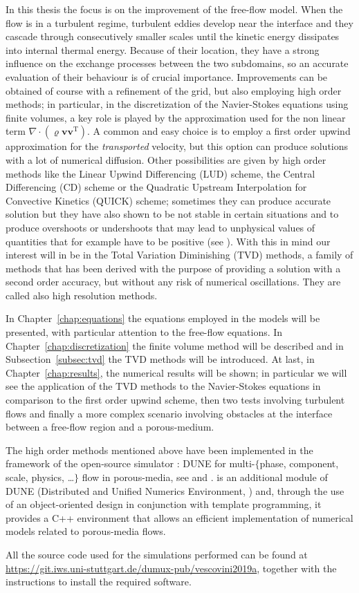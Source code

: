 In this thesis the focus is on the improvement of the free-flow model. When the 
flow is in a turbulent regime, turbulent eddies develop near the interface and 
they cascade through consecutively smaller scales until the kinetic energy 
dissipates into internal thermal energy. Because of their location, they have 
a strong influence on the exchange processes between the two subdomains, so an 
accurate evaluation of their behaviour is of crucial importance. Improvements 
can be obtained of course with a refinement of the grid, but also employing 
high order methods; in 
particular, in the discretization of the Navier-Stokes equations using finite 
volumes, a key role is played by the approximation used for the non linear term 
$\nabla \cdot (\varrho \mathbf{v} \mathbf{v}^\mathrm{T})$. A common and easy 
choice is to employ a first order upwind approximation for the 
\emph{transported} velocity, but this option can produce solutions with a lot 
of numerical diffusion. Other possibilities are given by high order methods 
like the Linear Upwind Differencing (LUD) scheme, the Central Differencing (CD) 
scheme or the Quadratic Upstream Interpolation for Convective Kinetics (QUICK) 
scheme; sometimes they can produce 
accurate solution but they have also shown to be not stable in certain 
situations and to produce overshoots or undershoots that 
may lead to unphysical values of quantities that for example have to be 
positive (see \cite{main:vermal}). With this in mind our interest will in be in 
the Total Variation Diminishing (TVD) methods, a family of methods that has 
been derived with the purpose of providing a solution with a second order 
accuracy, but without any risk of numerical oscillations. They are called also 
high resolution methods.

In Chapter~\ref{chap:equations} the equations employed in the models will be 
presented, with particular attention to the free-flow equations. In 
Chapter~\ref{chap:discretization} the finite volume method will be described 
and in Subsection~\ref{subsec:tvd} the TVD methods will be introduced. At last, 
in Chapter~\ref{chap:results}, the numerical results will be shown; in 
particular we will see the application of the TVD methods to the Navier-Stokes 
equations in comparison to the first order upwind scheme, then two tests 
involving turbulent flows and finally a more complex scenario involving 
obstacles at the interface between a free-flow region and a porous-medium.

The high order methods mentioned above have been implemented in the framework 
of the open-source simulator \DUMUX: DUNE for multi-$\{$phase, component, 
scale, physics, \dots$\}$ flow in porous-media, see \cite{dumux:tutti} and 
\cite{dumux:flemisch}. \DUMUX is an 
additional module of DUNE (Distributed and Unified Numerics Environment, 
\cite{web:dune}) and, through the use of an object-oriented design in 
conjunction with template programming, it provides a C++ environment that 
allows 
an efficient implementation of numerical models related to porous-media flows.

All the source code used for the simulations performed can be 
found at \url{https://git.iws.uni-stuttgart.de/dumux-pub/vescovini2019a}, 
together with the instructions to install the required software.